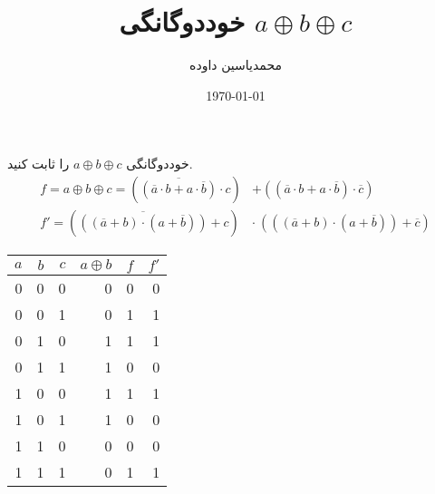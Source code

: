 \documentclass[a4paper]{article}
\author{محمدیاسین داوده}
\date{\today}
\title{خوددوگانگی \(a \oplus b \oplus c\)}
\begin{document}
\maketitle
خوددوگانگی \(a \oplus b \oplus c\) را ثابت کنید.
\begin{align*}
f = a \oplus b \oplus c = (\overline{(\overline{a} \cdot b + a \cdot \overline{b})} \cdot c) &+ ((\overline{a} \cdot b + a \cdot \overline{b}) \cdot \overline{c}) \\
f' = (\overline{((\overline{a} + b) \cdot (a + \overline{b}))} + c) &\cdot \: (((\overline{a} + b) \cdot (a + \overline{b})) + \overline{c})
\end{align*}
\begin{LTR}
\begin{center}
\begin{tabular}{rrr|r|rr}
\(a\) & \(b\) & \(c\) & \(a \oplus b\) & \(f\) & \(f'\)\\
\hline
0 & 0 & 0 & 0 & 0 & 0\\
0 & 0 & 1 & 0 & 1 & 1\\
0 & 1 & 0 & 1 & 1 & 1\\
0 & 1 & 1 & 1 & 0 & 0\\
1 & 0 & 0 & 1 & 1 & 1\\
1 & 0 & 1 & 1 & 0 & 0\\
1 & 1 & 0 & 0 & 0 & 0\\
1 & 1 & 1 & 0 & 1 & 1\\
\end{tabular}
\end{center}
\end{LTR}
\end{document}

